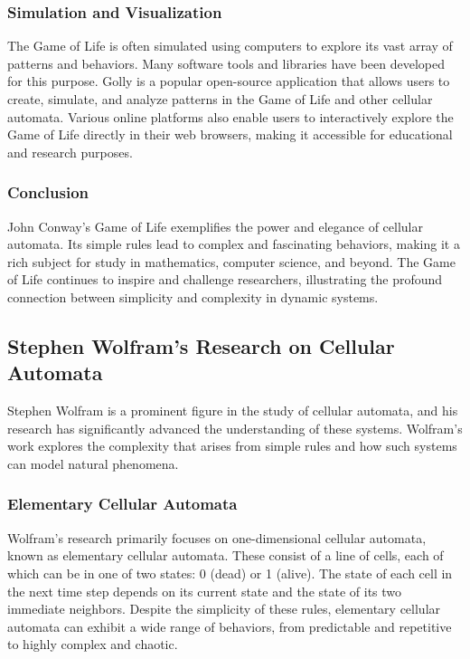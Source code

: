 \documentclass[9pt,a4paper,twoside]{tau-class/tau}
\begin{document}
    \subsubsection{Simulation and Visualization}

    The Game of Life is often simulated using computers to explore its vast array of patterns and behaviors. Many software tools and libraries have been developed for this purpose. Golly is a popular open-source application that allows users to create, simulate, and analyze patterns in the Game of Life and other cellular automata\cite{golly}. Various online platforms also enable users to interactively explore the Game of Life directly in their web browsers, making it accessible for educational and research purposes.

    \subsubsection{Conclusion}

    John Conway's Game of Life exemplifies the power and elegance of cellular automata. Its simple rules lead to complex and fascinating behaviors, making it a rich subject for study in mathematics, computer science, and beyond. The Game of Life continues to inspire and challenge researchers, illustrating the profound connection between simplicity and complexity in dynamic systems.

    \subsection{Stephen Wolfram's Research on Cellular Automata}

    Stephen Wolfram is a prominent figure in the study of cellular automata, and his research has significantly advanced the understanding of these systems. Wolfram's work explores the complexity that arises from simple rules and how such systems can model natural phenomena.\cite{wolfram1983}

    \subsubsection{Elementary Cellular Automata}

    Wolfram's research primarily focuses on one-dimensional cellular automata, known as elementary cellular automata. These consist of a line of cells, each of which can be in one of two states: 0 (dead) or 1 (alive). The state of each cell in the next time step depends on its current state and the state of its two immediate neighbors. Despite the simplicity of these rules, elementary cellular automata can exhibit a wide range of behaviors, from predictable and repetitive to highly complex and chaotic.
\end{document}
